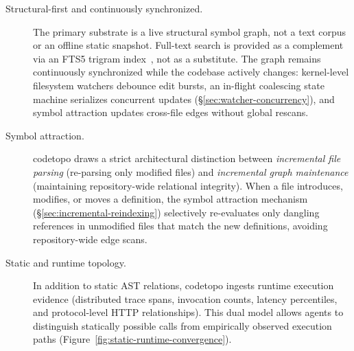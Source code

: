 \begin{description}
  \item[Structural-first and continuously synchronized.] The primary substrate is a
        live structural symbol graph, not a text corpus or an offline static snapshot.
        Full-text search is provided as a complement via an FTS5 trigram
        index~\cite{hipp2014fts5}, not as a substitute. The graph remains continuously
        synchronized while the codebase actively changes: kernel-level filesystem
        watchers debounce edit bursts, an in-flight coalescing state machine serializes
        concurrent updates (\S\ref{sec:watcher-concurrency}), and symbol attraction
        updates cross-file edges without global rescans.
  \item[Symbol attraction.] codetopo draws a strict architectural distinction between
        \emph{incremental file parsing} (re-parsing only modified files) and
        \emph{incremental graph maintenance} (maintaining repository-wide relational
        integrity). When a file introduces, modifies, or moves a definition, the
        symbol attraction mechanism (\S\ref{sec:incremental-reindexing}) selectively
        re-evaluates only dangling references in unmodified files that match the new
        definitions, avoiding repository-wide edge scans.
  \item[Static and runtime topology.] In addition to static AST relations, codetopo
        ingests runtime execution evidence (distributed trace spans, invocation counts,
        latency percentiles, and protocol-level HTTP relationships). This dual model
        allows agents to distinguish statically possible calls from empirically observed
        execution paths (Figure~\ref{fig:static-runtime-convergence}).

\begin{figure}[htbp]
\centering
{}
\end{figure}
\end{description}
